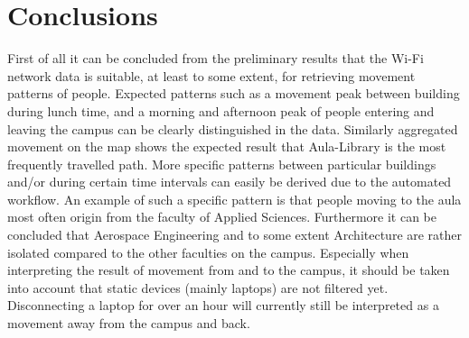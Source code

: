 \chapter{Conclusions}
First of all it can be concluded from the preliminary results that the Wi-Fi network data is suitable, at least to some extent, for retrieving movement patterns of people. Expected patterns such as a movement peak between building during lunch time, and a morning and afternoon peak of people entering and leaving the campus can be clearly distinguished in the data. Similarly aggregated movement on the map shows the expected result that Aula-Library is the most frequently travelled path. More specific patterns between particular buildings and/or during certain time intervals can easily be derived due to the automated workflow. An example of such a specific pattern is that people moving to the aula most often origin from the faculty of Applied Sciences. Furthermore it can be concluded that Aerospace Engineering and to some extent Architecture are rather isolated compared to the other faculties on the campus. Especially when interpreting the result of movement from and to the campus, it should be taken into account that static devices (mainly laptops) are not filtered yet. Disconnecting a laptop for over an hour will currently still be interpreted as a movement away from the campus and back.